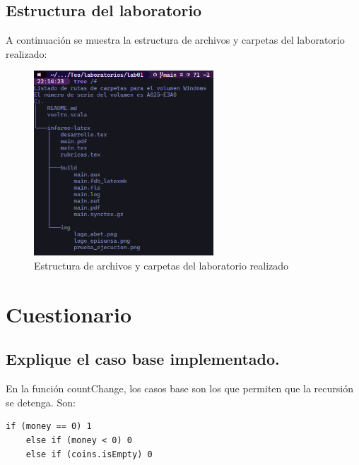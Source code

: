 
\subsection {Estructura del laboratorio}

A continuación se muestra la estructura de archivos y carpetas del laboratorio realizado:

\begin{figure}[H]
    \centering
    \includegraphics[width=0.6\textwidth]{img/estructura-lab01.png}
    \caption{Estructura de archivos y carpetas del laboratorio realizado}
    \label{fig:estructura_laboratorio}
\end{figure}

\section{Cuestionario}

\subsection{Explique el caso base implementado.}

En la función countChange, los casos base son los que permiten que la recursión se detenga. Son:

\begin{lstlisting}[style=scala-custom, caption={Casos base en la función countChange}]
    if (money == 0) 1
    else if (money < 0) 0
    else if (coins.isEmpty) 0
\end{lstlisting}

